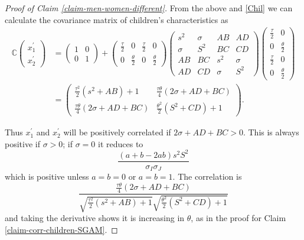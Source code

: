 \documentclass[
]{article}
\theoremstyle{definition}
\theoremstyle{definition}
\theoremstyle{definition}
\theoremstyle{definition}
\theoremstyle{remark}
\begin{document}
\begin{proof}[Proof of Claim \ref{claim-men-women-different}]
From the above and \eqref{Chil} we can calculate the
covariance matrix of children's characteristics as
\begin{align*}
\mathbb{C}\left(\begin{array}{c}
x_{1}^{\prime}\\
x_{2}^{\prime}
\end{array}\right) & =\left(\begin{array}{cc}
1 & 0\\
0 & 1
\end{array}\right)+\left(\begin{array}{cccc}
\frac{\tau}{2} & 0 & \frac{\tau}{2} & 0\\
0 & \frac{\theta}{2} & 0 & \frac{\theta}{2}
\end{array}\right)\left(\begin{array}{cccc}
s^{2} & \sigma & AB & AD\\
\sigma & S^{2} & BC & CD\\
AB & BC & s^{2} & \sigma\\
AD & CD & \sigma & S^{2}
\end{array}\right)\left(\begin{array}{cc}
\frac{\tau}{2} & 0\\
0 & \frac{\theta}{2}\\
\frac{\tau}{2} & 0\\
0 & \frac{\theta}{2}
\end{array}\right)\\
 & =\left(\begin{array}{cc}
\frac{\tau^{2}}{2}(s^{2}+AB)+1 & \frac{\tau\theta}{4}(2\sigma+AD+BC)\\
\frac{\tau\theta}{4}(2\sigma+AD+BC) & \frac{\theta^{2}}{2}(S^{2}+CD)+1
\end{array}\right).
\end{align*}

Thus $x_{1}^{\prime}$ and $x_{2}^{\prime}$ will be positively correlated
if $2\sigma+AD+BC>0$. This is always positive if $\sigma>0$; if $\sigma=0$ 
it reduces to
\[
\frac{(a+b-2ab)s^{2}S^{2}}{\sigma_{I}\sigma_{J}}
\]
which is positive unless $a=b=0$ or $a=b=1$. The correlation is
\[
\frac{
\frac{\tau\theta}{4}(2\sigma+AD+BC)
}{
\sqrt{\frac{\tau^{2}}{2}(s^{2}+AB)+1}
\sqrt{\frac{\theta^{2}}{2}(S^{2}+CD)+1}
}
\]
and taking the derivative shows it is increasing in $\theta$, as in the proof 
for Claim \ref{claim-corr-children-SGAM}.
\end{proof}
\end{document}
